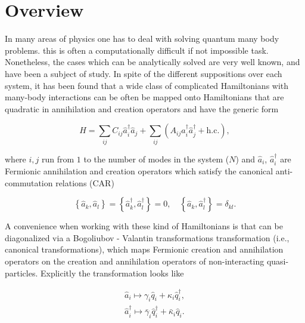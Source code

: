 \section{Overview}
In many areas of physics one has to deal with solving quantum many body problems. this is often a computationally difficult if not impossible task. Nonetheless, the cases which can be analytically solved are very well known, and have been a subject of study\cite{noauthor_density_2007,niu_majorana_2012,reyes-lega_aspects_2016,chung_density-matrix_2001,leijnse_introduction_2012, molinari_notes_2017,botero_bcs-like_2004, bravyi_lagrangian_2004, lieb_two_1961, latorre_ground_2004, katsura_statistical_1962, barouch_statistical_1971, barouch_statistical_1970}. In spite of the different suppositions over each system, it has been found that a wide class of complicated Hamiltonians with many-body interactions can be often be mapped onto Hamiltonians that are quadratic in annihilation and creation operators and have the generic form \cite{botero_bcs-like_2004}

\begin{equation}
\hat{H}=\sum_{i j} C_{i j} \hat{a}_{i}^{\dagger} \hat{a}_{j}+\sum_{i j}\left(A_{i j} \hat{a}_{i}^{\dagger}\hat{a}_{j}^{\dagger}+\mathrm{h.c.}\right),
\label{CH2:QuadraticHamiltonian}
\end{equation}

where $i,j$ run from $1$ to the number of modes in the system ($N$) and $\hat{a}_i$, $\hat{a}^{\dagger}_i$ are Fermionic annihilation and creation operators which satisfy the canonical anti-commutation relations (CAR)\cite{fradkin_field_1997}

\begin{equation}
\left\{\hat{a}_{k}, \hat{a}_{l}\right\}=\left\{\hat{a}_{k}^{\dagger}, \hat{a}_{l}^{\dagger}\right\}=0, \quad\left\{\hat{a}_{k}, \hat{a}_{l}^{\dagger}\right\}=\delta_{k l}.
\label{CH2:Anticommutation}
\end{equation}

\indent A convenience when working with these kind of Hamiltonians is that can be diagonalized via a Bogoliubov - Valantin transformations transformation (i.e., canonical transformations), which maps Fermionic creation and annihilation operators on the creation and annihilation operators of non-interacting quasi-particles\cite{berezin_method_1966,bogoljubov_new_1958}. Explicitly the transformation looks like

\begin{equation}
\begin{array}{c}
\hat{a}_{i} \mapsto \gamma_{i} \hat{q}_{i}+\kappa_{i} \hat{q}_{i}^{\dagger}, \\
\hat{a}_{i}^{\dagger} \mapsto \bar{\gamma}_{i} \hat{q}_{i}^{\dagger}+\bar{\kappa}_{i} \hat{q}_{i}.
\end{array}
\label{CH2:Bogoliuvov}
\end{equation}

